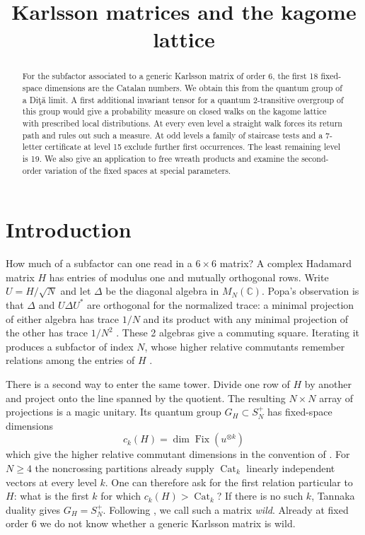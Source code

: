\documentclass[11pt,a4paper]{amsart}
\title{Karlsson matrices and the kagome lattice}
\newcommand{\Cat}{\operatorname{Cat}}
\newcommand{\Fix}{\operatorname{Fix}}
\begin{document}
\begin{abstract}
For the subfactor associated to a generic Karlsson matrix of order 6, the first 18 fixed-space dimensions are the Catalan numbers. We obtain this from the quantum group of a Di\c t\u a limit. A first additional invariant tensor for a quantum $2$-transitive overgroup of this group would give a probability measure on closed walks on the kagome lattice with prescribed local distributions. At every even level a straight walk forces its return path and rules out such a measure. At odd levels a family of staircase tests and a 7-letter certificate at level 15 exclude further first occurrences. The least remaining level is 19. We also give an application to free wreath products and examine the second-order variation of the fixed spaces at special parameters.
\end{abstract}
\maketitle
{\hypersetup{linkcolor=magenta}\tableofcontents}

\section*{Introduction}

How much of a subfactor can one read in a $6\times6$ matrix? A complex Hadamard matrix $H$ has entries of modulus one and mutually orthogonal rows. Write $U=H/\sqrt N$ and let $\Delta$ be the diagonal algebra in $M_N(\mathbb C)$. Popa's observation is that $\Delta$ and $U\Delta U^*$ are orthogonal for the normalized trace: a minimal projection of either algebra has trace $1/N$ and its product with any minimal projection of the other has trace $1/N^2$ \cite{pop}. These 2 algebras give a commuting square. Iterating it produces a subfactor of index $N$, whose higher relative commutants remember relations among the entries of $H$ \cite{ni,jon}.

There is a second way to enter the same tower. Divide one row of $H$ by another and project onto the line spanned by the quotient. The resulting $N\times N$ array of projections is a magic unitary. Its quantum group $G_H\subset S_N^+$ has fixed-space dimensions
\[
 c_k(H)=\dim\Fix(u^{\otimes k})
\]
which give the higher relative commutant dimensions in the convention of \cite{bo}. For $N\geq4$ the noncrossing partitions already supply $\Cat_k$ linearly independent vectors at every level $k$. One can therefore ask for the first relation particular to $H$: what is the first $k$ for which $c_k(H)>\Cat_k$? If there is no such $k$, Tannaka duality gives $G_H=S_N^+$. Following \cite{bo}, we call such a matrix \emph{wild}. Already at fixed order 6 we do not know whether a generic Karlsson matrix is wild.
\end{document}

